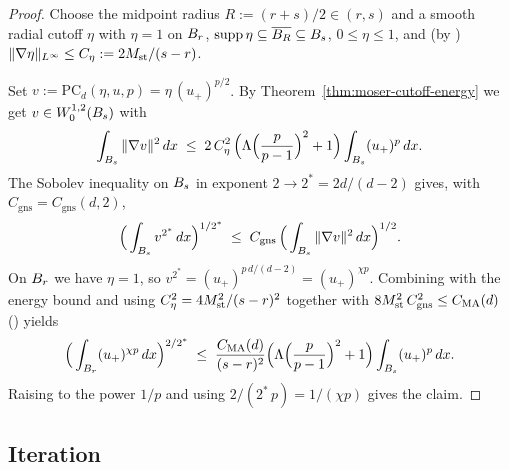 \begin{proof}
\leanok
{}

Choose the midpoint radius $R := (r+s)/2 \in (r,s)$ and a smooth radial cutoff
$\eta$ with $\eta = 1$ on $B_{r}$, $\operatorname{supp} \eta \subseteq \overline{B_{R}}
\subseteq B_{s}$, $0 \leq \eta \leq 1$, and (by
) $\|\nabla \eta\|_{L^\infty} \leq C_\eta := 2M_{\mathrm{st}}/(s-r)$.

Set $v := \mathrm{PC}_d(\eta,u,p) = \eta\,(u_+)^{p/2}$. By
Theorem~\ref{thm:moser-cutoff-energy} we get $v \in W^{1,2}_0(B_{s})$ with
\begin{equation*}
  \int_{B_{s}} \|\nabla v\|^{2}\,dx
  \;\leq\;
  2\,C_\eta^{2}\,\Big(\Lambda\Big(\frac{p}{p-1}\Big)^{2}+1\Big)
  \int_{B_{s}} (u_+)^{p}\,dx.
\end{equation*}
The Sobolev inequality  on $B_{s}$ in
exponent $2 \to 2^{*} = 2d/(d-2)$ gives, with $C_{\mathrm{gns}} = C_{\mathrm{gns}}(d,2)$,
\begin{equation*}
  \Big(\int_{B_{s}} v^{2^{*}}\,dx\Big)^{1/2^{*}}
  \;\leq\;
  C_{\mathrm{gns}}\,
  \Big(\int_{B_{s}} \|\nabla v\|^{2}\,dx\Big)^{1/2}.
\end{equation*}
On $B_{r}$ we have $\eta = 1$, so $v^{2^{*}} = (u_+)^{p\,d/(d-2)} = (u_+)^{\chi p}$.
Combining with the energy bound and using $C_\eta^2 = 4M_{\mathrm{st}}^2/(s-r)^2$ together
with $8M_{\mathrm{st}}^{2}\,C_{\mathrm{gns}}^{2} \leq C_{\mathrm{MA}}(d)$
() yields
\begin{equation*}
  \Big(\int_{B_{r}} (u_+)^{\chi p}\,dx\Big)^{2/2^{*}}
  \;\leq\;
  \frac{C_{\mathrm{MA}}(d)}{(s-r)^{2}}
  \Big(\Lambda\Big(\frac{p}{p-1}\Big)^{2}+1\Big)
  \int_{B_{s}} (u_+)^{p}\,dx.
\end{equation*}
Raising to the power $1/p$ and using $2/(2^{*}\,p)= 1/(\chi p)$ gives the
claim.
\end{proof}

\subsection{Iteration}

